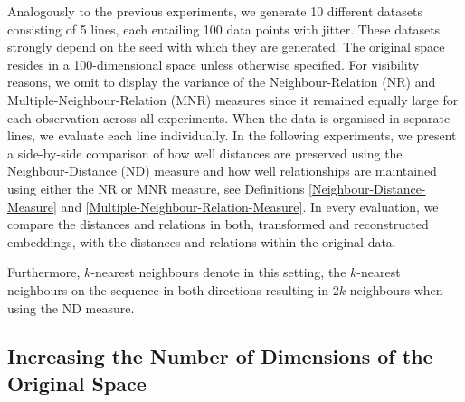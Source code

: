 \documentclass[pdftex,12pt,a4paper]{report}
\begin{document}
Analogously to the previous experiments, we generate 10 different datasets consisting of 5 lines, each entailing 100 data points with jitter.
These datasets strongly depend on the seed with which they are generated.
The original space resides in a 100-dimensional space unless otherwise specified.
For visibility reasons, we omit to display the variance of the Neighbour-Relation (NR) and Multiple-Neighbour-Relation (MNR) measures since it remained equally large for each observation across all experiments.
When the data is organised in separate lines, we evaluate each line individually.
In the following experiments, we present a side-by-side comparison of how well distances are preserved using the Neighbour-Distance (ND) measure and how well relationships are maintained using either the NR or MNR measure, see Definitions \ref{Neighbour-Distance-Measure} and \ref{Multiple-Neighbour-Relation-Measure}.
In every evaluation, we compare the distances and relations in both, transformed and reconstructed embeddings, with the distances and relations within the original data.

Furthermore, $k$-nearest neighbours denote in this setting, the $k$-nearest neighbours on the sequence in both directions resulting in $2k$ neighbours when using the ND measure.

\subsection{Increasing the Number of Dimensions of the Original Space} \label{subsec:avg_dev_vs_dyn_high}
\end{document}
